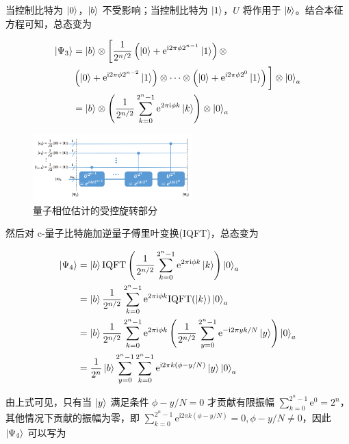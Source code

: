 \documentclass[aps,prl,twocolumn,groupedaddress]{revtex4-2}
\begin{document}
当控制比特为 $\ket{0}$，$\ket{b}$ 不受影响；当控制比特为 $\ket{1}$，$U$ 将作用于 $\ket{b}$。结合本征方程可知，总态变为

$$
\begin{aligned}
\ket{\Psi_3}
&=\ket{b}\otimes \bigg[\frac{1 }{2^{n/2} } \left(\ket{0}+\mathrm{e}^{\mathrm{i}2\pi \phi 2^{n-1}}\ket{1} \right)\otimes \\
&\left(\ket{0}+\mathrm{e}^{\mathrm{i}2\pi \phi 2^{n-2}}\ket{1} \right)\otimes \cdots \otimes \left(\ket{0}+\mathrm{e}^{\mathrm{i}2\pi \phi 2^0}\ket{1} \right) \bigg]\otimes\ket{0}_a \\
&=\ket{b} \otimes \left(\frac{1 }{2^{n/2} } \sum_{k=0}^{2^n-1} \mathrm{e}^{2\pi\mathrm{i}\phi k} \ket{k} \right)\otimes \ket{0}_a
\end{aligned}
$$

\begin{figure}[htbp]
    \centering
    \includegraphics[width=0.55\textwidth]{fig/fig2.png}
    \caption{量子相位估计的受控旋转部分}
    \label{fig2}
\end{figure}

然后对 c-量子比特施加逆量子傅里叶变换(IQFT)，总态变为

$$
\begin{aligned}
\ket{\Psi_4}
&=\ket{b}\mathrm{IQFT}\left(\frac{1 }{2^{n/2} } \sum_{k=0}^{2^n-1} \mathrm{e}^{2\pi\mathrm{i}\phi k} \ket{k} \right) \ket{0}_a \\
&=\ket{b}\frac{1 }{2^{n/2} } \sum_{k=0}^{2^n-1} \mathrm{e}^{2\pi\mathrm{i}\phi k} \mathrm{IQFT}(\ket{k}) \ket{0}_a \\
&=\ket{b}\frac{1 }{2^{n/2} } \sum_{k=0}^{2^n-1} \mathrm{e}^{2\pi\mathrm{i}\phi k} \left(\frac{1 }{2^{n/2} } \sum_{y=0}^{2^n-1} \mathrm{e}^{-\mathrm{i}2\pi yk/N} \ket{y} \right) \ket{0}_a \\
&=\frac{1 }{2^n } \ket{b} \sum_{y=0}^{2^n-1}\sum_{k=0}^{2^n-1}\mathrm{e}^{\mathrm{i}2\pi k(\phi-y/N)}\ket{y}\ket{0}_a
\end{aligned}
$$

由上式可见，只有当 $\ket{y}$ 满足条件 $\phi-y/N=0$ 才贡献有限振幅 $\displaystyle{\sum_{k=0}^{2^n-1} \mathrm{e}^0 = 2^n }$，其他情况下贡献的振幅为零，即 $\displaystyle{\sum_{k=0}^{2^n-1}\mathrm{e}^{\mathrm{i}2\pi k (\phi-y/N)}=0,\phi-y/N\ne 0 }$，因此 $\ket{\Psi_4}$ 可以写为
\end{document}
